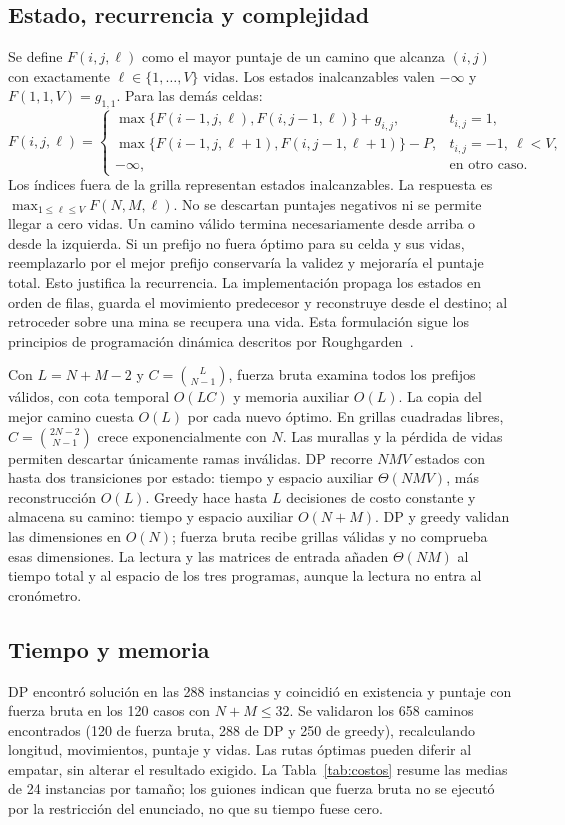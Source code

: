 \subsection{Estado, recurrencia y complejidad}
Se define $F(i,j,\ell)$ como el mayor puntaje de un camino que alcanza
$(i,j)$ con exactamente $\ell\in\{1,\ldots,V\}$ vidas. Los estados
inalcanzables valen $-\infty$ y $F(1,1,V)=g_{1,1}$. Para las demás celdas:
\[
F(i,j,\ell)=
\begin{cases}
\max\{F(i-1,j,\ell),F(i,j-1,\ell)\}+g_{i,j}, & t_{i,j}=1,\\
\max\{F(i-1,j,\ell+1),F(i,j-1,\ell+1)\}-P, & t_{i,j}=-1,\ \ell<V,\\
-\infty, & \text{en otro caso}.
\end{cases}
\]
Los índices fuera de la grilla representan estados inalcanzables. La
respuesta es $\max_{1\leq\ell\leq V}F(N,M,\ell)$. No se descartan puntajes
negativos ni se permite llegar a cero vidas. Un camino válido termina
necesariamente desde arriba o desde la izquierda. Si un prefijo no fuera
óptimo para su celda y sus vidas, reemplazarlo por el mejor prefijo
conservaría la validez y mejoraría el puntaje total. Esto justifica la
recurrencia. La implementación propaga los estados en orden de filas,
guarda el movimiento predecesor y reconstruye desde el destino; al
retroceder sobre una mina se recupera una vida. Esta formulación sigue los
principios de programación dinámica descritos por Roughgarden~\cite{roughgarden2019algorithms}.

Con $L=N+M-2$ y $C=\binom{L}{N-1}$, fuerza bruta examina todos los
prefijos válidos, con cota temporal $O(LC)$ y memoria auxiliar $O(L)$.
La copia del mejor camino cuesta $O(L)$ por cada nuevo óptimo. En grillas cuadradas libres,
$C=\binom{2N-2}{N-1}$ crece exponencialmente con $N$.
Las murallas y la pérdida de vidas permiten descartar únicamente ramas
inválidas. DP recorre $NMV$ estados con hasta dos transiciones por estado:
tiempo y espacio auxiliar $\Theta(NMV)$, más reconstrucción $O(L)$.
Greedy hace hasta $L$ decisiones de costo constante y almacena su camino:
tiempo y espacio auxiliar $O(N+M)$. DP y greedy validan las dimensiones en
$O(N)$; fuerza bruta recibe grillas válidas y no comprueba esas dimensiones.
La lectura y las matrices de
entrada añaden $\Theta(NM)$ al tiempo total y al espacio de los tres
programas, aunque la lectura no entra al cronómetro.

\subsection{Tiempo y memoria}
DP encontró solución en las 288 instancias y coincidió en existencia y
puntaje con fuerza bruta en los 120 casos con $N+M\leq32$. Se validaron
los 658 caminos encontrados (120 de fuerza bruta, 288 de DP y 250 de
greedy), recalculando longitud, movimientos, puntaje y vidas. Las rutas
óptimas pueden diferir al empatar, sin alterar el resultado exigido.
La Tabla~\ref{tab:costos} resume las medias de 24 instancias por tamaño;
los guiones indican que fuerza bruta no se ejecutó por la restricción del
enunciado, no que su tiempo fuese cero.

